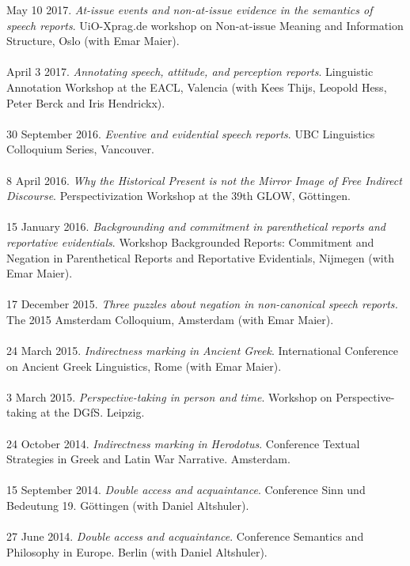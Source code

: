 \documentclass[a4paper,11pt]{article}
\begin{document}
May 10 2017. \emph{At-issue events and non-at-issue evidence in the semantics of speech reports}. UiO-Xprag.de workshop on Non-at-issue Meaning and Information Structure, Oslo (with Emar Maier).\\\\
April 3 2017.  \emph{Annotating speech, attitude, and perception reports}. Linguistic Annotation Workshop at the EACL, Valencia (with Kees Thijs, Leopold Hess, Peter Berck and Iris Hendrickx).\\\\
30 September 2016. \emph{Eventive and evidential speech reports}. UBC Linguistics Colloquium Series, Vancouver. \\\\
8 April 2016. \emph{Why the Historical Present is not the Mirror Image of Free Indirect Discourse}. Perspectivization Workshop at the 39th GLOW, G\"ottingen.\\\\
15 January 2016. \emph{Backgrounding and commitment in parenthetical reports and reportative evidentials}. Workshop Backgrounded Reports:
Commitment and Negation in Parenthetical Reports and Reportative Evidentials, Nijmegen (with Emar Maier).\\\\
17 December 2015. \emph{Three puzzles about negation in non-canonical speech reports.} The 2015 Amsterdam Colloquium, Amsterdam (with Emar Maier).\\\\
24 March 2015. \emph{Indirectness marking in Ancient Greek}. International Conference on Ancient Greek Linguistics, Rome (with Emar Maier).\\\\
3 March 2015. \emph{Perspective-taking in person and time}. Workshop on Perspective-taking at the DGfS. Leipzig.\\\\ 
24 October 2014. \emph{Indirectness marking in Herodotus}. Conference Textual Strategies in Greek and Latin War Narrative. Amsterdam.\\\\
15 September 2014. \emph{Double access and acquaintance}. Conference Sinn und Bedeutung 19. G\"ottingen (with Daniel Altshuler).\\\\
27 June 2014. \emph{Double access and acquaintance}. Conference Semantics and Philosophy in Europe. Berlin (with Daniel Altshuler).\\\\
\end{document}
